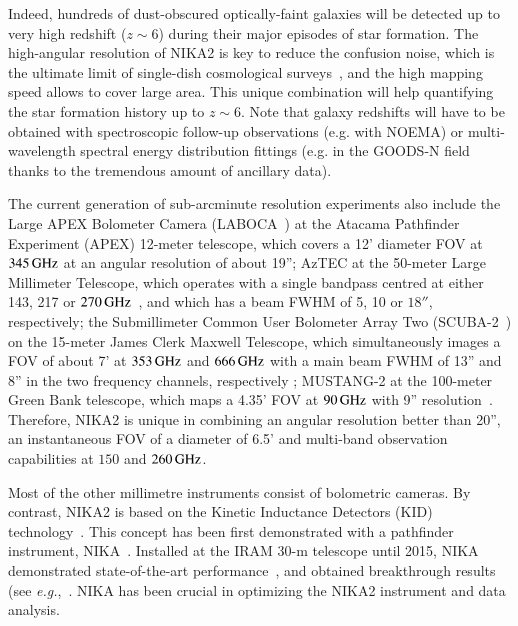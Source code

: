 \documentclass[traditionalabstract]{aa}
\newcommand{\lp}[1]{#1}
\begin{document}
Indeed, hundreds of dust-obscured optically-faint galaxies will be
detected up to very high redshift ($z \sim 6$) during their major
episodes of star formation. The high-angular resolution of NIKA2 is
key to reduce the confusion noise, which is the ultimate limit of
single-dish cosmological surveys~\citep{Bethermin2017_simu}, and the
high mapping speed allows to cover large area. This unique combination
will help quantifying the star formation history up to $z \sim
6$. Note that galaxy redshifts will have to be obtained with
spectroscopic follow-up observations (e.g. with NOEMA) or
multi-wavelength spectral energy distribution fittings (e.g. in the
GOODS-N field thanks to the tremendous amount of ancillary data).

The current generation of sub-arcminute resolution experiments also
include the Large APEX Bolometer Camera
(LABOCA~\citep{Siringo2009_LABOCA}) at the Atacama
Pathfinder Experiment (APEX) 12-meter telescope, which covers a
12' diameter FOV at $345\, \rm{GHz}$ {\lp at an angular resolution of about
19''}; AzTEC at the 50-meter Large Millimeter Telescope, which operates with a
single bandpass centred at either 143, 217 or
$270\,\rm{GHz}$~\citep{Wilson2008_AZTEC}, {\lp and which has a beam
FWHM of 5, 10 or $18''$, respectively}; the Submillimeter Common User Bolometer
Array Two (SCUBA-2~\citep{Holland2013_SCUBA2,Dempsey2013_SCUBA2}) on the
15-meter James Clerk Maxwell Telescope, which simultaneously
images a FOV of about 7' at $353\,\rm{GHz}$ and $666\,\rm{GHz}$ {\lp with a main beam FWHM of 13''
and 8'' in the two frequency channels, respectively}
; MUSTANG-2 at the 100-meter Green Bank telescope,
which maps a 4.35' FOV at 
$90\,\rm{GHz}$ {\lp with 9'' resolution}~\citep{Dicker2014_MUSTANG2, Stanchfield2016_MUSTANG2}.
Therefore, NIKA2 is unique
in combining an angular resolution better than 20'', an instantaneous FOV of a
diameter of 6.5' and multi-band observation capabilities at $150$ and
$260\,\rm{GHz}$.


Most of the other millimetre instruments consist of bolometric cameras. By contrast,
NIKA2 is based on the Kinetic Inductance Detectors (KID)
technology~\citep{Day2003, Doyle2008_LEKID, Shu2018_LEKID}. This concept has been
first demonstrated with a pathfinder instrument,
NIKA~\citep{Monfardini2010_NIKA, Monfardini2011_NIKA}.
Installed at the IRAM 30-m telescope until 2015, NIKA demonstrated
state-of-the-art performance~\citep{Catalano2014}, and obtained
breakthrough results
(see \emph{e.g.},~\citet{Adam2014, Adam2017_kSZ}.
NIKA has been crucial in optimizing the NIKA2 instrument and data
analysis. 
\end{document}
